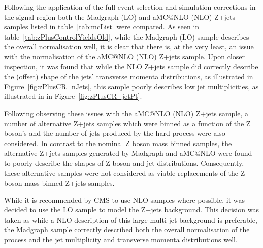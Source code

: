 Following the application of the full event selection and simulation corrections in the signal region both the Madgraph (LO) and aMC@NLO (NLO) Z+jets samples listed in table~\ref{tab:mcList} were compared.
As seen in table~\ref{tab:zPlusControlYieldsOld}, while the Madgraph (LO) sample describes the overall normalisation well, it is clear that there is, at the very least, an issue with the normalisation of the aMC@NLO (NLO) Z+jets sample.
Upon closer inspection, it was found that while the NLO Z+jets sample did correctly describe the (offset) shape of the jets' transverse momenta distributions, as illustrated in Figure~\ref{fig:zPlusCR_nJets}, this sample poorly describes low jet multiplicities, as illustrated in in Figure~\ref{fig:zPlusCR_jetPt}.

Following observing these issues with the aMC@NLO (NLO) Z+jets sample, a number of alternative Z+jets samples which were binned as a function of the Z boson's \pT and the number of jets produced by the hard process were also considered.
In contrast to the nominal Z boson mass binned samples, the alternative Z+jets samples generated by Madgraph and aMC@NLO were found to poorly describe the shapes of Z boson and jet distributions.
Consequently, these alternative samples were not considered as viable replacements of the Z boson mass binned Z+jets samples.

While it is recommended by CMS to use NLO samples where possible, it was decided to use the LO sample to model the Z+jets background.
This decision was taken as while a NLO description of this large multi-jet background is preferable, the Madgraph sample correctly described both the overall normalisation of the process and the jet multiplicity and transverse momenta distributions well.

